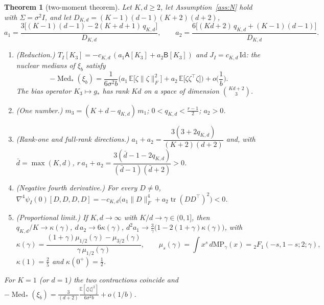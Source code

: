 \documentclass[10pt]{article}
\newtheorem{theorem}{Theorem}
\theoremstyle{definition}
\theoremstyle{remark}
\newcommand{\E}{\mathbb{E}}
\newcommand{\nF}[1]{\|#1\|_{F}}
\newcommand{\tr}{\operatorname{tr}}
\newcommand{\Med}{\operatorname{Med}}
\newcommand{\cA}{\mathsf{A}}
\newcommand{\cB}{\mathsf{B}}
\begin{document}
\begin{theorem}[two-moment theorem]\label{thm:two}
Let $K,d\ge2$, let Assumption~\ref{ass:N} hold with $\Sigma=\sigma^2I$, and let $D_{K,d}=(K-1)(d-1)(K+2)(d+2)$,
\begin{equation}\label{eq:a12}
a_1=\frac{3\big[(K-1)(d-1)-2(K+d+1)\,q_{K,d}\big]}{D_{K,d}},\qquad
a_2=\frac{6\big[(Kd+2)\,q_{K,d}+(K-1)(d-1)\big]}{D_{K,d}} .
\end{equation}
\begin{enumerate}[label=(\alph*),itemsep=1pt,topsep=2pt]
\item \emph{(Reduction.)} $T_I[K_3]=-c_{K,d}\,(a_1\cA[K_3]+a_2\cB[K_3])$ and $J_I=c_{K,d}\,\mathrm{Id}$: the nuclear medians
of $\xi_b$ satisfy
\begin{equation}\label{eq:two}
-\Med_\ast(\xi_b)=\frac1{6\sigma^2b}\Big(a_1\,\E\big[\zeta\nF\zeta^2\big]+a_2\,\E\big[\zeta\zeta^\top\zeta\big]\Big)+o\Big(\frac1b\Big).
\end{equation}
The bias operator $K_3\mapsto g_\ast$ has rank $Kd$ on a space of dimension $\binom{Kd+2}3$.
\item \emph{(One number.)} $m_3=(K+d-q_{K,d})\,m_1$; $0<q_{K,d}<\frac{r-1}2$; $a_2>0$.
\item \emph{(Rank-one and full-rank directions.)}
$a_1+a_2=\dfrac{3(3+2q_{K,d})}{(K+2)(d+2)}$ and, with $\bar d=\max(K,d)$,
$r\,a_1+a_2=\dfrac{3(\bar d-1-2q_{K,d})}{(\bar d-1)(\bar d+2)}>0$.
\item \emph{(Negative fourth derivative.)} For every $D\ne0$,
$\nabla^4\psi_I(0)[D,D,D,D]=-c_{K,d}\big(a_1\nF D^4+a_2\tr(DD^\top)^2\big)<0$.
\item \emph{(Proportional limit.)} If $K,d\to\infty$ with $K/d\to\gamma\in(0,1]$, then $q_{K,d}/K\to\kappa(\gamma)$,
$d\,a_2\to6\kappa(\gamma)$, $d^2a_1\to\frac3\gamma\big(1-2(1+\gamma)\kappa(\gamma)\big)$, with
\[
\kappa(\gamma)=\frac{(1+\gamma)\mu_{1/2}(\gamma)-\mu_{3/2}(\gamma)}{\gamma\,\mu_{1/2}(\gamma)},\qquad
\mu_s(\gamma)=\int x^s\,d\mathrm{MP}_\gamma(x)={}_2F_1(-s,1-s;2;\gamma),
\]
$\kappa(1)=\frac25$ and $\kappa(0^+)=\frac12$.
\end{enumerate}
For $K=1$ (or $d=1$) the two contractions coincide and
$-\Med_\ast(\xi_b)=\frac{3}{(d+2)}\frac{\E[\zeta|\zeta|^2]}{6\sigma^2b}+o(1/b)$.
\end{theorem}
\end{document}
